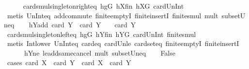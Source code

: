 \begin{isabellebody}
\ \ \ \ \isamarkupfalse%
\ card{\isacharunderscore}{\kern0pt}smul{\isacharunderscore}{\kern0pt}singleton{\isacharunderscore}{\kern0pt}right{\isacharunderscore}{\kern0pt}eq\ hgG\ hXfin\ hXG\ card{\isacharunderscore}{\kern0pt}Un{\isacharunderscore}{\kern0pt}Int\isanewline
\ \ \ \ \isamarkupfalse%
\ {\isacharparenleft}{\kern0pt}metis\ Un{\isacharunderscore}{\kern0pt}Int{\isacharunderscore}{\kern0pt}eq{\isacharparenleft}{\kern0pt}{}{\isacharparenright}{\kern0pt}\ add{\isachardot}{\kern0pt}commute\ finite{\isachardot}{\kern0pt}emptyI\ finite{\isachardot}{\kern0pt}insertI\ finite{\isacharunderscore}{\kern0pt}smul\ mult{\isacharunderscore}{\kern0pt}{}\ subset{\isacharunderscore}{\kern0pt}Un{\isacharunderscore}{\kern0pt}eq{\isacharparenright}{\kern0pt}\isanewline
\ \ \isamarkupfalse%
\ hYadd{\isacharcolon}{\kern0pt}\ {\isachardoublequoteopen}card\ {\isacharquery}{\kern0pt}Y{}\ {\isacharplus}{\kern0pt}\ card\ {\isacharquery}{\kern0pt}Y{}\ {\isacharequal}{\kern0pt}\ {}\ {\isacharasterisk}{\kern0pt}\ card\ Y{\isachardoublequoteclose}\isanewline
\ \ \ \ \isamarkupfalse%
\ card{\isacharunderscore}{\kern0pt}smul{\isacharunderscore}{\kern0pt}singleton{\isacharunderscore}{\kern0pt}left{\isacharunderscore}{\kern0pt}eq\ hgG\ hYfin\ hYG\ card{\isacharunderscore}{\kern0pt}Un{\isacharunderscore}{\kern0pt}Int\ finite{\isacharunderscore}{\kern0pt}smul\isanewline
\ \ \ \ \isamarkupfalse%
\ {\isacharparenleft}{\kern0pt}metis\ Int{\isacharunderscore}{\kern0pt}lower{}\ Un{\isacharunderscore}{\kern0pt}Int{\isacharunderscore}{\kern0pt}eq{\isacharparenleft}{\kern0pt}{}{\isacharparenright}{\kern0pt}\ card{\isacharunderscore}{\kern0pt}{}{\isacharunderscore}{\kern0pt}eq\ card{\isacharunderscore}{\kern0pt}Un{\isacharunderscore}{\kern0pt}le\ card{\isacharunderscore}{\kern0pt}seteq\ finite{\isachardot}{\kern0pt}emptyI\ finite{\isachardot}{\kern0pt}insertI\ \ \isanewline
\ \ \ \ \ \ hY{}ne\ le{\isacharunderscore}{\kern0pt}add{\isacharunderscore}{\kern0pt}same{\isacharunderscore}{\kern0pt}cancel{}\ mult{\isacharunderscore}{\kern0pt}{}\ subset{\isacharunderscore}{\kern0pt}Un{\isacharunderscore}{\kern0pt}eq{\isacharparenright}{\kern0pt}\isanewline
\ \ \isamarkupfalse%
\ False\isanewline
\ \ \isamarkupfalse%
\ {\isacharparenleft}{\kern0pt}cases\ {\isachardoublequoteopen}card\ {\isacharquery}{\kern0pt}X{}\ {\isacharplus}{\kern0pt}\ card\ {\isacharquery}{\kern0pt}Y{}\ {\isachargreater}{\kern0pt}\ card\ X\ {\isacharplus}{\kern0pt}\ card\ Y{\isachardoublequoteclose}{\isacharparenright}{\kern0pt}\isanewline

\end{isabellebody}
